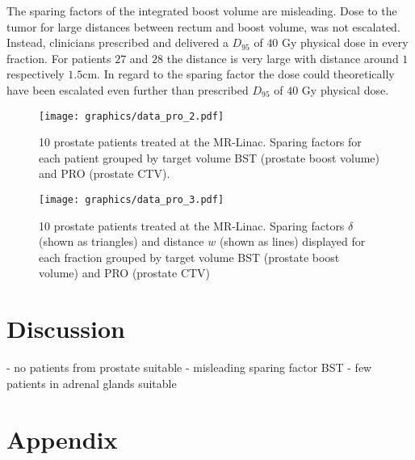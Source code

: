 \documentclass[\relativeRoot/ada.tex]{subfiles}
\begin{document}
The sparing factors of the integrated boost volume are misleading. Dose to the tumor for large distances between rectum and boost volume, was not escalated. Instead, clinicians prescribed and delivered a $D_{95}$ of $40$ Gy physical dose in every fraction. For patients $27$ and $28$ the distance is very large with distance around $1$ respectively $1.5$cm. In regard to the sparing factor the dose could theoretically have been escalated even further than prescribed $D_{95}$ of $40$ Gy physical dose.

\begin{figure}[!htb]
    \centering
    \texttt{[image: graphics/data\_pro\_2.pdf]}
    \caption{10 prostate patients treated at the MR-Linac. Sparing factors for each patient grouped by target volume BST (prostate boost volume) and PRO (prostate CTV).}
    \label{fig:data_pro_2}
\end{figure}

\begin{figure}[!htb]
    \centering
    \texttt{[image: graphics/data\_pro\_3.pdf]}
    \caption{10 prostate patients treated at the MR-Linac. Sparing factors $\delta$ (shown as triangles) and distance $w$ (shown as lines) displayed for each fraction grouped by target volume BST (prostate boost volume) and PRO (prostate CTV)}
    \label{fig:data_pro_3}
\end{figure}

\section{Discussion}

- no patients from prostate suitable
- misleading sparing factor BST
- few patients in adrenal glands suitable



\clearpage
\newpage

\printbibliography{}

\newpage

\section*{Appendix}

%


\renewcommand{\thesubsection}{\Alph{subsection}}
\renewcommand\thefigure{\thesubsection.\arabic{figure}}

\setcounter{figure}{0}
\setcounter{subsection}{0}
\end{document}
